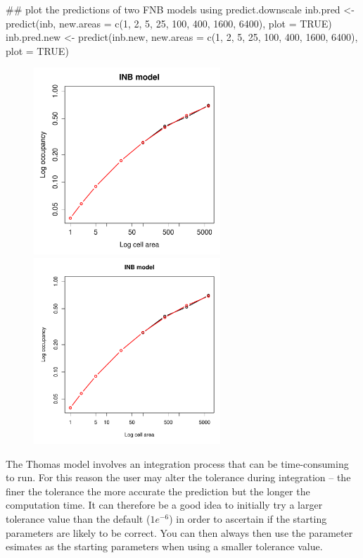 \documentclass{article}[12pt, a4paper]
\begin{document}
\begin{Schunk}
\begin{Sinput}
## plot the predictions of two FNB models using predict.downscale
inb.pred <- predict(inb,
                    new.areas = c(1, 2, 5, 25, 100, 400, 1600, 6400),
                    plot = TRUE)
inb.pred.new <- predict(inb.new,
                        new.areas = c(1, 2, 5, 25, 100, 400, 1600, 6400),
                        plot = TRUE)
\end{Sinput}
\end{Schunk}
\begin{figure}[!h]
\centering
\includegraphics[width=7cm]{Downscaling-downscale13}
\includegraphics[width=7cm]{Downscaling-downscale14}
\end{figure}


The Thomas model involves an integration process that can be time-consuming to run. For this reason the user may alter the tolerance during integration – the finer the tolerance the more accurate the prediction but the longer the computation time. It can therefore be a good idea to initially try a larger tolerance value than the default ($1e^{-6}$) in order to ascertain if the starting parameters are likely to be correct. You can then always then use the parameter esimates as the starting parameters when using a smaller tolerance value.
\end{document}
